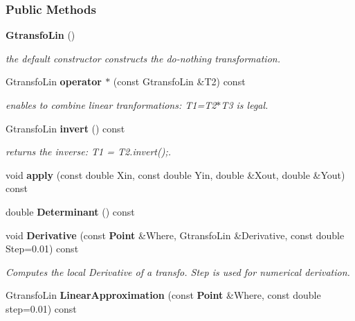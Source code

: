 \subsubsection*{Public Methods}
\begin{CompactItemize}
\item 
{}
{\bf Gtransfo\-Lin} ()\label{class_gtransfolin_a0}

\begin{CompactList}\small\item\em the default constructor constructs the do-nothing transformation.\item\end{CompactList}\item 
{}
Gtransfo\-Lin {\bf operator $\ast$} (const Gtransfo\-Lin \&T2) const\label{class_gtransfolin_a1}

\begin{CompactList}\small\item\em enables to combine linear tranformations: T1=T2$\ast$T3 is legal.\item\end{CompactList}\item 
{}
Gtransfo\-Lin {\bf invert} () const\label{class_gtransfolin_a2}

\begin{CompactList}\small\item\em returns the inverse: T1 = T2.invert();.\item\end{CompactList}\item 
{}
void {\bf apply} (const double Xin, const double Yin, double \&Xout, double \&Yout) const\label{class_gtransfolin_a3}

\item 
{}
double {\bf Determinant} () const\label{class_gtransfolin_a4}

\item 
void {\bf Derivative} (const {\bf Point} \&Where, Gtransfo\-Lin \&Derivative, const double Step=0.01) const
\begin{CompactList}\small\item\em Computes the local Derivative of a transfo. Step is used for numerical derivation.\item\end{CompactList}\item 
{}
Gtransfo\-Lin {\bf Linear\-Approximation} (const {\bf Point} \&Where, const double step=0.01) const\label{class_gtransfolin_a6}


\end{CompactItemize}
